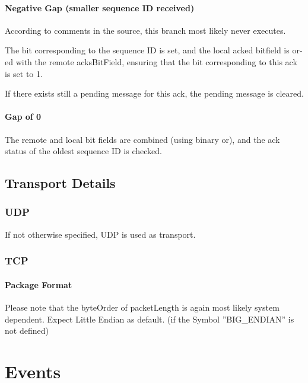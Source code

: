 \subsubsection{Negative Gap (smaller sequence ID received)}

According to comments in the source, this branch most likely never executes.

The bit corresponding to the sequence ID is set, and the local acked bitfield is or-ed with the remote acksBitField, ensuring that the bit corresponding to this ack is set to 1. 

If there exists still a pending message for this ack, the pending message is cleared.

\subsubsection{Gap of 0}

The remote and local bit fields are combined (using binary or), and the ack status of the oldest sequence ID is checked.

\section{Transport Details}

\subsection{UDP}
If not otherwise specified, UDP is used as transport.

\subsection{TCP}

\subsubsection{Package Format}

\begin{messagedef}
\end{messagedef}

Please note that the byteOrder of packetLength is again most likely system dependent. Expect Little Endian as default. (if the Symbol ''BIG\_ENDIAN'' is not defined)

\chapter{Events}

